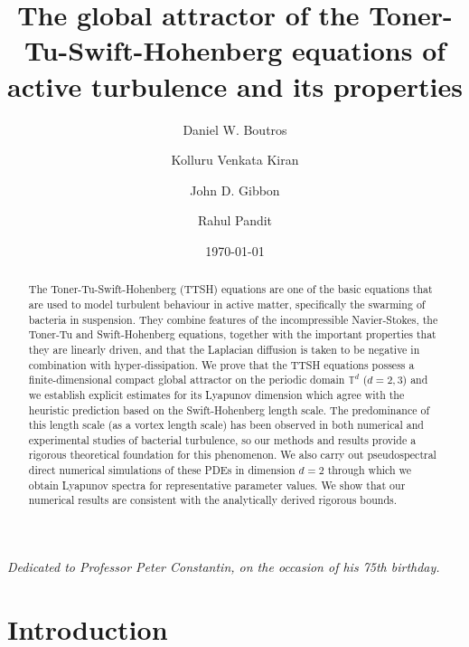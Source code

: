 \documentclass[11pt]{amsart}
\title[\small Global attractor of the TTSH equations]{The global attractor of the Toner-Tu-Swift-Hohenberg equations of active turbulence and its properties}
\author[D. W. Boutros]{Daniel W. Boutros}
\author[K. V. Kiran]{Kolluru Venkata Kiran}
\author[J. D. Gibbon]{John D. Gibbon}
\author[R. Pandit]{Rahul Pandit}
\date{\today}
\theoremstyle{definition}
\numberwithin{equation}{section}
\numberwithin{equation}{section}
\begin{document}
\par\vspace{-2mm}
\begin{abstract}
The Toner-Tu-Swift-Hohenberg (TTSH) equations are one of the basic equations that are used to model turbulent behaviour in active matter, specifically the swarming of bacteria in suspension. They combine features of the incompressible Navier-Stokes, the Toner-Tu and Swift-Hohenberg equations, together with the important properties that they are linearly driven, and that the Laplacian diffusion is taken to be negative in combination with hyper-dissipation. We prove that the TTSH equations possess a finite-dimensional compact global attractor on the periodic domain $\mathbb{T}^d$ ($d=2,3$) and we establish explicit estimates for its Lyapunov dimension which agree with the heuristic prediction based on the Swift-Hohenberg length scale. The predominance of this length scale (as a vortex length scale) has been observed in both numerical and experimental studies of bacterial turbulence, so our methods and results provide a rigorous theoretical foundation for this phenomenon. We also carry out pseudospectral direct numerical simulations of these PDEs in dimension $d=2$ through which we obtain Lyapunov spectra for representative parameter values. We show that our numerical results are consistent with the analytically derived rigorous bounds.
\end{abstract}
\maketitle
\par\vspace{-7mm}
{\centering \textit{\small Dedicated to Professor Peter Constantin, on the occasion of his 75th birthday.} \par}
\par\vspace{-4mm}
\tableofcontents

\section{\large Introduction}
\end{document}
